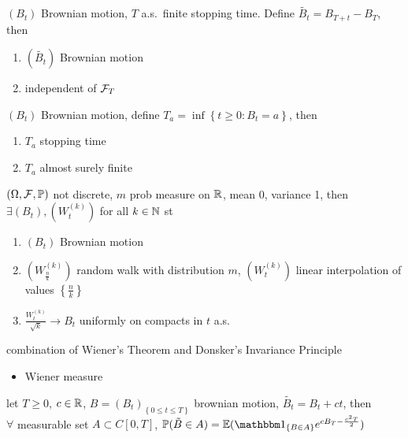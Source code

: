 \begin{prop}
    $(B_t)$ Brownian motion, $T$ a.s.\ finite stopping time. Define $\tilde{B_t} = B_{T+t} - B_T$, then
    \begin{enumerate}
        \item $(\tilde{B_t})$ Brownian motion
        \item independent of $\mathcal{F}_T$
    \end{enumerate}
\end{prop}

\begin{prop}
    $(B_t)$ Brownian motion, define $T_a = \inf \left\{ t \geq 0 : B_t = a \right\}$, then
    \begin{enumerate}
        \item $T_a$ stopping time
        \item $T_a$ almost surely finite
    \end{enumerate}
\end{prop}

\begin{thm}
    $(\Omega, \mathcal{F}, \mathbb{P})$ not discrete, $m$ prob measure on $\mathbb{R}$, mean 0, variance 1, then $\exists (B_t), (W_t^{(k)})$ for all $k \in \mathbb{N}$ st
    \begin{enumerate}
        \item $(B_t)$ Brownian motion
        \item $(W_{\frac{n}{k}}^{(k)})$ random walk with distribution $m$, $(W_t^{(k)})$ linear interpolation of values $\left\{ \frac{n}{k} \right\}$
        \item $\frac{W_t^{(k)}}{\sqrt{k}} \rightarrow B_t$ uniformly on compacts in $t$ a.s.\
    \end{enumerate}
\end{thm}

\begin{fact}
    combination of Wiener's Theorem and Donsker's Invariance Principle
\end{fact}

\begin{itemize}
    \item Wiener measure
\end{itemize}

\begin{prop}
    let $T \geq 0$, $c \in \mathbb{R}$, $B = (B_t)_{\left\{ 0 \leq t \leq T \right\}}$ brownian motion, $\tilde{B_t} = B_t + ct$, then\\
    $\forall$ measurable set $A \subset C[0,T]$, $\Pb(\tilde{B} \in A) = \Ex(\In_{\left\{ B \in A \right\}}e^{cB_T - \frac{c^2 T}{2}})$
\end{prop}

